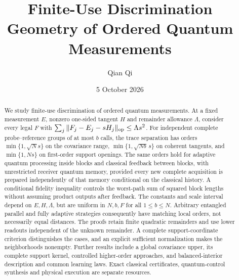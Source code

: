\documentclass[11pt]{amsart}
\title[Finite-use discrimination geometry]{Finite-Use Discrimination Geometry of Ordered Quantum Measurements}
\author{Qian Qi}
\date{5 October 2026}
\numberwithin{equation}{section}
\theoremstyle{definition}\newtheorem{definition}[theorem]{Definition}
\theoremstyle{remark}\newtheorem{remark}[theorem]{Remark}
\begin{document}
\raggedbottom
\begin{abstract}
We study finite-use discrimination of ordered quantum measurements.
At a fixed measurement $E$, nonzero one-sided tangent $H$ and
remainder allowance $\Lambda$, consider every legal $F$ with
$\sum_j\|F_j-E_j-sH_j\|_{\rm op}\le\Lambda s^2$.
For independent complete probe--reference groups of at most $b$
calls, the trace separation has orders $\min\{1,\sqrt N s\}$
on the covariance range, $\min\{1,\sqrt{Nb}\,s\}$ on coherent
tangents, and $\min\{1,Ns\}$ on first-order support openings.
The same orders hold for adaptive quantum processing inside blocks
and classical feedback between blocks, with unrestricted receiver
quantum memory, provided every new complete acquisition is prepared
independently of that memory conditional on the classical history.
A conditional fidelity inequality controls the worst-path sum of
squared block lengths without assuming product outputs after feedback.
The constants and scale interval depend on $E,H,\Lambda$, but are
uniform in $N,b,F$ for all $1\le b\le N$.
Arbitrary entangled parallel and fully adaptive strategies consequently
have matching local orders, not necessarily equal distances.
The proofs retain finite quadratic remainders and use lower readouts
independent of the unknown remainder.  A complete support-coordinate
criterion distinguishes the cases, and an explicit sufficient
normalization makes the neighborhoods nonempty.
Further results include a global covariance upper, its complete
support kernel, controlled higher-order approaches, and
balanced-interior description and common learning laws.
Exact classical certificates, quantum-control synthesis and
physical execution are separate resources.
\end{abstract}
\maketitle


















\end{document}
